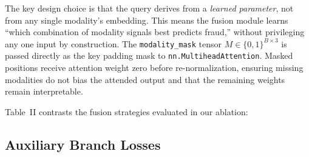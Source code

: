 \documentclass[10pt,conference,letterpaper]{IEEEtran}
\begin{document}
The key design choice is that the query derives from a \textit{learned parameter},
not from any single modality's embedding. This means the fusion module learns
``which combination of modality signals best predicts fraud,'' without privileging any
one input by construction. The \texttt{modality\_mask} tensor $M \in \{0,1\}^{B \times
3}$ is passed directly as the key padding mask to \texttt{nn.MultiheadAttention}.
Masked positions receive attention weight zero before re-normalization, ensuring missing
modalities do not bias the attended output and that the remaining weights remain
interpretable.

Table~II contrasts the fusion strategies evaluated in our ablation:

\begin{table}[H]
\caption{Fusion Strategy Comparison}
\label{tab:fusion_strategies}
\begin{center}
\end{center}
\end{table}

\subsection{Auxiliary Branch Losses}
\end{document}
